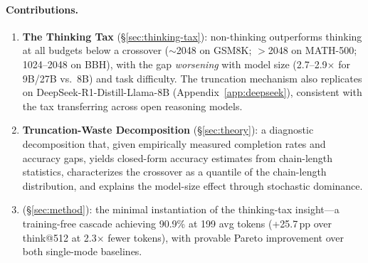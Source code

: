 \paragraph{Contributions.}
\begin{enumerate}[nosep,leftmargin=*]
    \item \textbf{The Thinking Tax} (\S\ref{sec:thinking-tax}): non-thinking outperforms thinking at all budgets below a crossover (${\sim}$2048 on GSM8K; ${>}$2048 on MATH-500; 1024--2048 on BBH), with the gap \emph{worsening} with model size (2.7--2.9$\times$ for 9B/27B vs.\ 8B) and task difficulty. The truncation mechanism also replicates on DeepSeek-R1-Distill-Llama-8B (Appendix~\ref{app:deepseek}), consistent with the tax transferring across open reasoning models.
    \item \textbf{Truncation-Waste Decomposition} (\S\ref{sec:theory}): a diagnostic decomposition that, given empirically measured completion rates and accuracy gaps, yields closed-form accuracy estimates from chain-length statistics, characterizes the crossover as a quantile of the chain-length distribution, and explains the model-size effect through stochastic dominance.
    \item \textbf{\method{}} (\S\ref{sec:method}): the minimal instantiation of the thinking-tax insight---a training-free cascade achieving 90.9\% at 199 avg tokens (+25.7\,pp over think@512 at 2.3$\times$ fewer tokens), with provable Pareto improvement over both single-mode baselines.
\end{enumerate}
